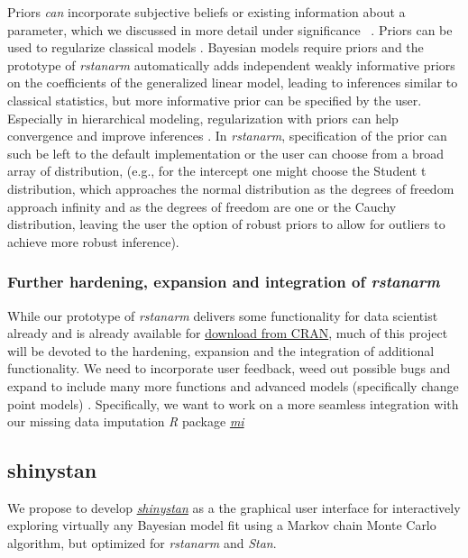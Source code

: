\documentclass[11pt,notitlepage]{article}
\begin{document}
Priors \textit{can} incorporate subjective beliefs or existing information 
about a parameter,  which we discussed in more detail under significance \
\cite{carlin1997bayes}. 
Priors can be used to regularize classical models \cite{gelman2008weakly}. 
Bayesian models require priors and the prototype of \textit{rstanarm} 
automatically adds independent weakly 
informative priors on the coefficients of the generalized linear model, 
leading to inferences similar to classical statistics,  but more informative 
prior can be specified by the user. Especially in hierarchical modeling, 
regularization with priors can help convergence and improve inferences 
\cite{Gelman-Hill_2014}. In \textit{rstanarm}, specification of the prior 
can such be left to the default implementation or the user can choose from 
a broad array of distribution, (e.g., for the intercept one might choose the 
Student t distribution, which approaches the normal distribution as the 
degrees of freedom approach infinity and as the degrees of freedom are 
one or the Cauchy distribution, leaving the user the option of robust 
priors to allow for outliers to achieve more robust inference). 

\subsubsection*{Further hardening, expansion and integration of \textit{rstanarm}}
While our prototype of \textit{rstanarm} delivers some functionality for data scientist already and is already available for \href{https://cran.rstudio.com/web/packages/rstanarm/}{download from CRAN}, much of this project will be devoted to the hardening, expansion and the integration of additional functionality. We need to incorporate user feedback, weed out possible bugs and expand to include many more functions and advanced models (specifically change point models) \cite{Hall2000}. Specifically, we want to  work on a more seamless integration with our missing data imputation \textit{R} package \href{https://cran.r-project.org/web/packages/mi/index.html}{\textit{mi}}

\subsection*{shinystan}
We propose to develop \href{http://andrewgelman.com/2015/03/02/introducing-shinystan/}
{\textit{shinystan}} as a the graphical user interface for interactively 
exploring virtually any Bayesian model fit using a Markov chain Monte Carlo algorithm, 
but optimized for \textit{rstanarm} and \textit{Stan}. 
\end{document}
